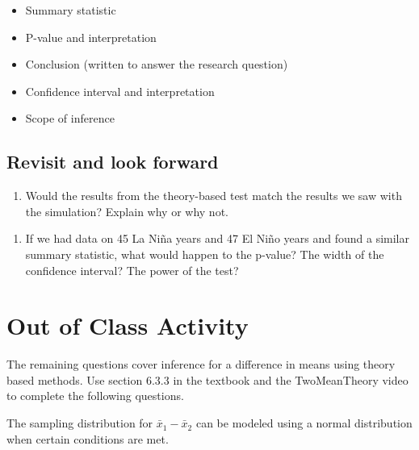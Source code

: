 \documentclass[
]{report}
\providecommand{\tightlist}{%
  \setlength{\itemsep}{0pt}\setlength{\parskip}{0pt}}
\begin{document}
\begin{itemize}
\item
  Summary statistic
\item
  P-value and interpretation
\item
  Conclusion (written to answer the research question)
\item
  Confidence interval and interpretation
\item
  Scope of inference
\end{itemize}

\vspace{3in}

\hypertarget{revisit-and-look-forward}{%
\subsection*{Revisit and look forward}\label{revisit-and-look-forward}}

\begin{enumerate}
\def\labelenumi{\arabic{enumi}.}
\setcounter{enumi}{20}
\tightlist
\item
  Would the results from the theory-based test match the results we saw with the simulation? Explain why or why not.
\end{enumerate}

\vspace{1in}

\begin{enumerate}
\def\labelenumi{\arabic{enumi}.}
\setcounter{enumi}{21}
\tightlist
\item
  If we had data on 45 La Ni\~{n}a years and 47 El Ni\~{n}o years and found a similar summary statistic, what would happen to the p-value? The width of the confidence interval? The power of the test?
\end{enumerate}

\vspace{1in}

\hypertarget{out-of-class-activity}{%
\section{Out of Class Activity}\label{out-of-class-activity}}

The remaining questions cover inference for a difference in means using theory based methods. Use section 6.3.3 in the textbook and the TwoMeanTheory video to complete the following questions.

The sampling distribution for \(\bar{x}_1-\bar{x}_2\) can be modeled using a normal distribution when certain conditions are met.
\end{document}
